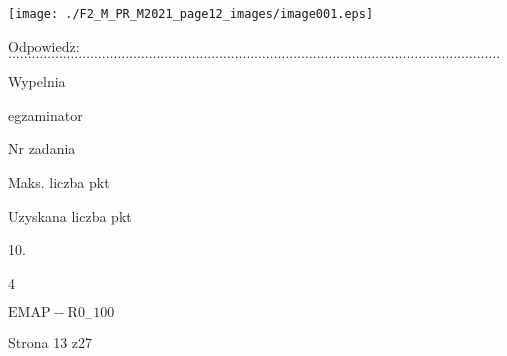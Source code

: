 \documentclass[a4paper,12pt]{article}
\begin{document}
\begin{center}
\texttt{[image: ./F2\_M\_PR\_M2021\_page12\_images/image001.eps]}
\end{center}
$\mathrm{O}\mathrm{d}\mathrm{p}\mathrm{o}\mathrm{w}\mathrm{i}\mathrm{e}\mathrm{d}\acute{\mathrm{z}}$:$\ldots\ldots\ldots\ldots\ldots\ldots\ldots\ldots\ldots\ldots\ldots\ldots\ldots\ldots\ldots\ldots\ldots\ldots\ldots\ldots\ldots\ldots\ldots\ldots\ldots\ldots\ldots\ldots\ldots\ldots\ldots\ldots\ldots\ldots\ldots\ldots\ldots\ldots\ldots\ldots\ldots\ldots$

Wypelnia

egzaminator

Nr zadania

Maks. liczba pkt

Uzyskana liczba pkt

10.

4

$\mathrm{E}\mathrm{M}\mathrm{A}\mathrm{P}-\mathrm{R}0_{-}100$

Strona 13 z27
\end{document}
